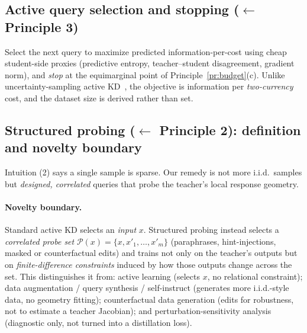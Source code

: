 \documentclass[11pt]{article}
\begin{document}
\subsection{Active query selection and stopping (\texorpdfstring{$\leftarrow$}{<-} Principle 3)}
Select the next query to maximize predicted information-per-cost using cheap student-side proxies (predictive entropy, teacher--student disagreement, gradient norm), and \emph{stop} at the equimarginal point of Principle~\ref{pr:budget}(c). Unlike uncertainty-sampling active KD~\cite{luccioli2025budget,elad2025}, the objective is information per \emph{two-currency} cost, and the dataset size is derived rather than set.

\subsection{Structured probing (\texorpdfstring{$\leftarrow$}{<-} Principle 2): definition and novelty boundary}
\label{sec:probing}
Intuition (2) says a single sample is sparse. Our remedy is not more i.i.d.\ samples but \emph{designed, correlated} queries that probe the teacher's local response geometry.

\paragraph{Novelty boundary.} Standard active KD selects an \emph{input} $x$. Structured probing instead selects a \emph{correlated probe set} $\mathcal{P}(x)=\{x, x'_1,\dots,x'_m\}$ (paraphrases, hint-injections, masked or counterfactual edits) and trains not only on the teacher's outputs but on \emph{finite-difference constraints} induced by how those outputs change across the set. This distinguishes it from: active learning (selects $x$, no relational constraint); data augmentation / query synthesis / self-instruct (generates more i.i.d.-style data, no geometry fitting); counterfactual data generation (edits for robustness, not to estimate a teacher Jacobian); and perturbation-sensitivity analysis (diagnostic only, not turned into a distillation loss).
\end{document}
